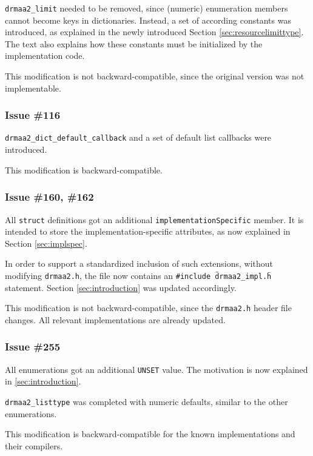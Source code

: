 \documentclass{article}
\newcommand{\h}[1]{\texttt{#1}}
\newcommand{\rat}[1]{}
\begin{document}
\lstinline{drmaa2_limit} needed to be removed, since (numeric) enumeration members cannot become keys in dictionaries. Instead, a set of according constants was introduced, as explained in the newly introduced Section \ref{sec:resourcelimittype}. The text also explains how these constants must be initialized by the implementation code.

\rat{The issue text further discusses why the extern const approach was favoured over a simple macro definition. The main reason is convinience for C++ people.}

This modification is not backward-compatible, since the original version was not implementable.

\subsubsection*{Issue \#116}

\h{drmaa2\_dict\_default\_callback} and a set of default list callbacks were introduced.

This modification is backward-compatible.

\subsubsection*{Issue \#160, \#162}

All \h{struct} definitions got an additional \h{implementationSpecific} member. It is intended to store the implementation-specific attributes, as now explained in Section \ref{sec:implspec}.

In order to support a standardized inclusion of such extensions, without modifying \h{drmaa2.h}, the file now contains an \h{\#include \"drmaa2\_impl.h\"} statement. Section \ref{sec:introduction} was updated accordingly.

This modification is not backward-compatible, since the \h{drmaa2.h} header file changes. All relevant implementations are already updated.

\subsubsection*{Issue \#255}

All enumerations got an additional \h{UNSET} value. The motivation is now explained in \ref{sec:introduction}.

\h{drmaa2\_listtype} was completed with numeric defaults, similar to the other enumerations.

This modification is backward-compatible for the known implementations and their compilers.
\end{document}
